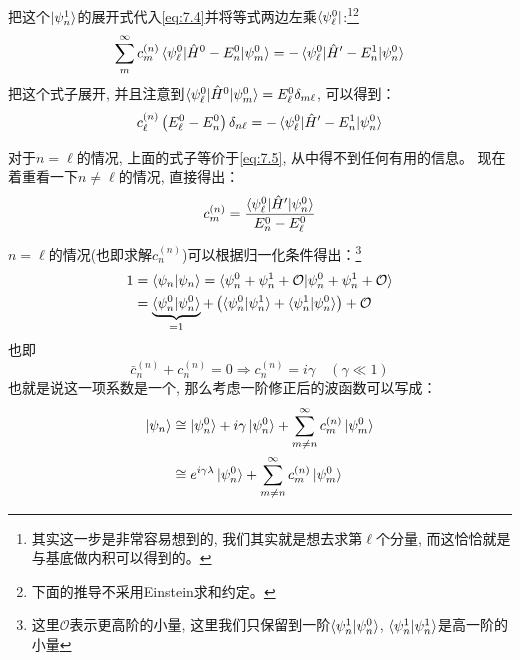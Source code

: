 \documentclass[a4paper,zihao=-4,linespread=1]{ctexrep}
\begin{document}
    把这个$\ket{\psi_n^1}$的展开式代入\ref{eq:7.4}并将等式两边左乘$\bra{\psi_\ell^0}$:\footnote{其实这一步是非常容易想到的, 我们其实就是想去求第$\ell$个分量, 而这恰恰就是与基底做内积可以得到的。}\footnote{下面的推导不采用Einstein求和约定。}
    \begin{equation}
        \sum\limits_{m}^\infty c_m^{(n)}\braket{\psi_\ell^0|\hat{H}^0-E_n^0|\psi_m^0}=-\braket{\psi_\ell^0|\hat{H}^\prime-E_n^1|\psi_n^0}
    \end{equation}
    把这个式子展开, 并且注意到$\braket{\psi_\ell^0|\hat{H}^0|\psi_m^0}=E_\ell^0\delta_{m\ell}$, 可以得到：
    \begin{equation}
        c^{(n)}_\ell \left(E^0_\ell -E^0_n\right)\delta_{n\ell}=-\braket{\psi_\ell^0|\hat{H}^\prime-E_n^1|\psi_n^0}
    \end{equation}
    
    对于$n=\ell$的情况, 上面的式子等价于\ref{eq:7.5}, 从中得不到任何有用的信息。
    现在着重看一下$n\neq\ell$的情况, 直接得出：
    \[c_m^{(n)}=\frac{\braket{\psi_\ell^0|\hat{H}^\prime|\psi_n^0}}{E_n^0-E^0_\ell}\]
    $n=\ell$的情况(也即求解$c_n^{(n)}$)可以根据归一化条件得出：\footnote{这里$\mathcal{O}$表示更高阶的小量, 这里我们只保留到一阶$\braket{\psi_n^1|\psi_n^0}$, $\braket{\psi_n^1|\psi_n^1}$是高一阶的小量}
    \begin{align*}
        1&=\braket{\psi_n|\psi_n}=\braket{\psi_n^0+\psi_n^1+\mathcal{O}|\psi_n^0+\psi_n^1+\mathcal{O}}\\
        &=\underbrace{\braket{\psi_n^0|\psi_n^0}}_{=1}+\left(\braket{\psi_n^0|\psi_n^1}+\braket{\psi_n^1|\psi_n^0}\right)+\mathcal{O}
    \end{align*}
    也即$$\bar{c}_n^{(n)}+c_n^{(n)}=0\Rightarrow c_n^{(n)}=i\gamma\quad\left(\gamma\ll 1\right)$$ 
    也就是说这一项系数是一个, 那么考虑一阶修正后的波函数可以写成：
    \begin{align*}
        \ket{\psi_n}&\cong \ket{\psi_n^0}+i\gamma\ket{\psi_n^0}+\sum\limits_{m\neq n}^\infty c_m^{(n)}\ket{\psi_m^0}\\
        &\cong e^{i\gamma\lambda}\ket{\psi_n^0}+\sum\limits_{m\neq n}^\infty c_m^{(n)}\ket{\psi_m^0}
    \end{align*}
\end{document}
